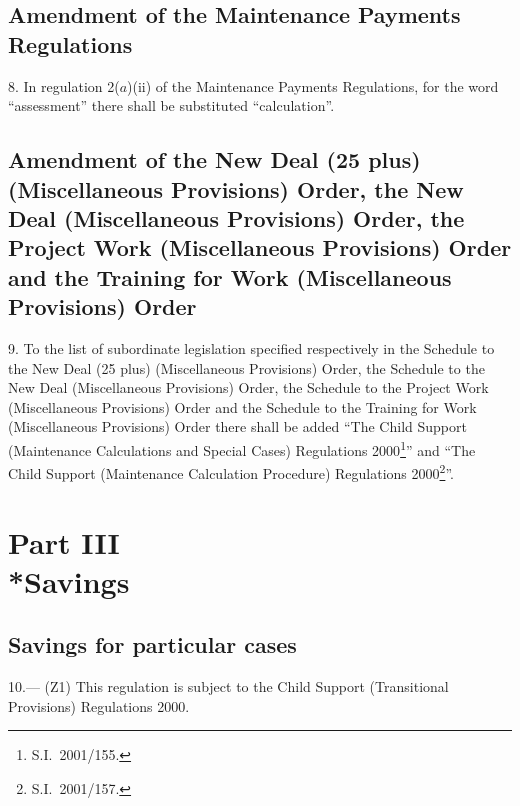 \documentclass[12pt,a4paper]{article}
\begin{document}
\subsection[8. Amendment of the Maintenance Payments Regulations]{Amendment of the Maintenance Payments Regulations}

8.  In regulation 2($a$)(ii) of the Maintenance Payments Regulations, for the word “assessment” there shall be substituted “calculation”.

\subsection[9. Amendment of the New Deal (25 plus) (Miscellaneous Provisions) Order, the New Deal (Miscellaneous Provisions) Order, the Project Work (Miscellaneous Provisions) Order and the Training for Work (Miscellaneous Provisions) Order]{Amendment of the New Deal (25 plus) (Miscellaneous Provisions) Order, the New Deal (Miscellaneous Provisions) Order, the Project Work (Miscellaneous Provisions) Order and the Training for Work (Miscellaneous Provisions) Order}

\enlargethispage{\baselineskip}

9.  To the list of subordinate legislation specified respectively in the Schedule to the New Deal (25 plus) (Miscellaneous Provisions) Order, the Schedule to the New Deal (Miscellaneous Provisions) Order, the Schedule to the Project Work (Miscellaneous Provisions) Order and the Schedule to the Training for Work (Miscellaneous Provisions) Order there shall be added “The Child Support (Maintenance Calculations and Special Cases) Regulations 2000\footnote{S.I.\ 2001/155.}” and “The Child Support (Maintenance Calculation Procedure) Regulations 2000\footnote{S.I.\ 2001/157.}”.

\section[Part III --- Savings]{Part III\\*Savings}

\renewcommand\parthead{--- Part III}

\subsection[10. Savings for particular cases]{Savings for particular cases}

10.---%
(Z1) This regulation is subject to the Child Support (Transitional Provisions) Regulations 2000.
\end{document}
